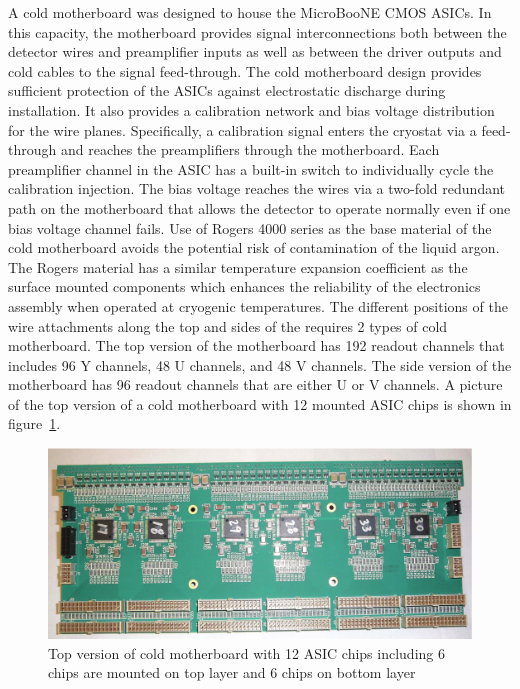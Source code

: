 A cold motherboard was designed to house the MicroBooNE CMOS ASICs. In this capacity, the motherboard provides signal interconnections both between the detector wires and preamplifier inputs as well as between the driver outputs and cold cables to the signal feed-through. The cold motherboard design provides sufficient protection of the ASICs against electrostatic discharge during installation. It also provides a calibration network and bias voltage distribution for the wire planes. Specifically, a calibration signal enters the cryostat via a feed-through and reaches the preamplifiers through the motherboard. Each preamplifier channel in the ASIC has a built-in switch to individually cycle the calibration injection. The bias voltage reaches the \lartpc wires via a two-fold redundant path on the motherboard that allows the detector to operate normally even if one bias voltage channel fails. Use of Rogers 4000 series as the base material of the cold motherboard avoids the potential risk of contamination of the liquid argon. The Rogers material has a similar temperature expansion coefficient as the surface mounted components which enhances the reliability of the electronics assembly when operated at cryogenic temperatures. The different positions of the wire attachments along the top and sides of the \lartpc requires 2 types of cold motherboard. The top version of the motherboard has 192 readout channels that includes 96 Y channels, 48 U channels, and 48 V channels. The side version of the motherboard has 96 readout channels that are either U or V channels. A picture of the top version of a cold motherboard with 12 mounted ASIC chips is shown in figure~\ref{fig:figmb}. 

\begin{figure}[hbt]
\centering
\includegraphics[width=0.75\linewidth]{figures/mb2.pdf}
\caption{\label{fig:figmb} Top version of cold motherboard with 12 ASIC chips including 6 chips are mounted on top layer and 6 chips on bottom layer}
\end{figure}


